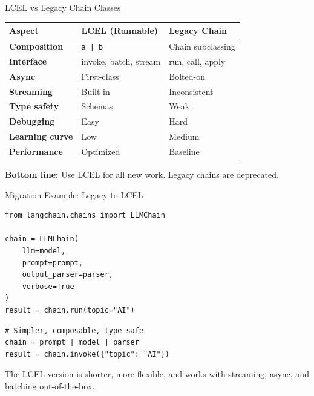 \documentclass[aspectratio=169,11pt]{beamer}
\begin{document}
\begin{frame}{LCEL vs Legacy Chain Classes}
  \small
  \begin{tabular}{|l|l|l|}
    \hline
    \textbf{Aspect} & \textbf{LCEL (Runnable)} & \textbf{Legacy Chain} \\
    \hline
    \textbf{Composition} & \texttt{a | b} & Chain subclassing \\
    \hline
    \textbf{Interface} & invoke, batch, stream & run, call, apply \\
    \hline
    \textbf{Async} & First-class & Bolted-on \\
    \hline
    \textbf{Streaming} & Built-in & Inconsistent \\
    \hline
    \textbf{Type safety} & Schemas & Weak \\
    \hline
    \textbf{Debugging} & Easy & Hard \\
    \hline
    \textbf{Learning curve} & Low & Medium \\
    \hline
    \textbf{Performance} & Optimized & Baseline \\
    \hline
  \end{tabular}

  \vspace{0.3em}
  \textbf{Bottom line:} Use LCEL for all new work. Legacy chains are deprecated.
\end{frame}

\begin{frame}[fragile]{Migration Example: Legacy to LCEL}
  \begin{codebox}
\begin{lstlisting}
from langchain.chains import LLMChain

chain = LLMChain(
    llm=model,
    prompt=prompt,
    output_parser=parser,
    verbose=True
)
result = chain.run(topic="AI")
\end{lstlisting}
  \end{codebox}

  \begin{codebox}
\begin{lstlisting}
# Simpler, composable, type-safe
chain = prompt | model | parser
result = chain.invoke({"topic": "AI"})
\end{lstlisting}
  \end{codebox}

  \vspace{0.12em}
  \small The LCEL version is shorter, more flexible, and works with streaming, async, and batching out-of-the-box.
\end{frame}
\end{document}
